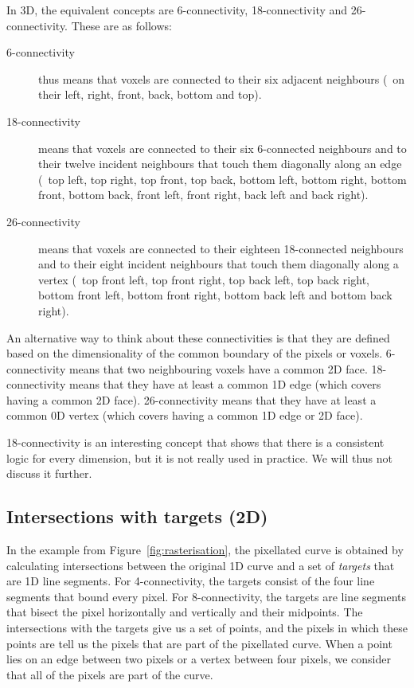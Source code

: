 In 3D, the equivalent concepts are 6-connectivity, 18-connectivity and 26-connectivity.
These are as follows:
\begin{description}
\item[6-connectivity] thus means that voxels are connected to their six adjacent neighbours (\ie\ on their left, right, front, back, bottom and top).
\item[18-connectivity] means that voxels are connected to their six 6-connected neighbours and to their twelve incident neighbours that touch them diagonally along an edge (\ie\ top left, top right, top front, top back, bottom left, bottom right, bottom front, bottom back, front left, front right, back left and back right).
\item[26-connectivity] means that voxels are connected to their eighteen 18-connected neighbours and to their eight incident neighbours that touch them diagonally along a vertex (\ie\ top front left, top front right, top back left, top back right, bottom front left, bottom front right, bottom back left and bottom back right).
\end{description}

An alternative way to think about these connectivities is that they are defined based on the dimensionality of the common boundary of the pixels or voxels.
6-connectivity means that two neighbouring voxels have a common 2D face.
18-connectivity means that they have at least a common 1D edge (which covers having a common 2D face).
26-connectivity means that they have at least a common 0D vertex (which covers having a common 1D edge or 2D face).

18-connectivity is an interesting concept that shows that there is a consistent logic for every dimension, but it is not really used in practice.
We will thus not discuss it further.

\subsection{Intersections with targets (2D)}

In the example from Figure~\ref{fig:rasterisation}, the pixellated curve is obtained by calculating intersections between the original 1D curve and a set of \emph{targets} that are 1D line segments.
For 4-connectivity, the targets consist of the four line segments that bound every pixel.
For 8-connectivity, the targets are line segments that bisect the pixel horizontally and vertically and their midpoints.
The intersections with the targets give us a set of points, and the pixels in which these points are tell us the pixels that are part of the pixellated curve.
When a point lies on an edge between two pixels or a vertex between four pixels, we consider that all of the pixels are part of the curve.

